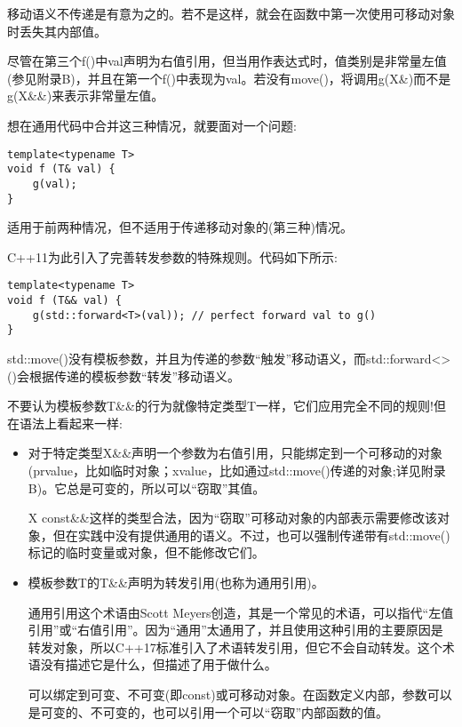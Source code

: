 \begin{tcolorbox}[colback=webgreen!5!white,colframe=webgreen!75!black]
\hspace*{0.75cm}移动语义不传递是有意为之的。若不是这样，就会在函数中第一次使用可移动对象时丢失其内部值。
\end{tcolorbox}

尽管在第三个f()中val声明为右值引用，但当用作表达式时，值类别是非常量左值(参见附录B)，并且在第一个f()中表现为val。若没有move()，将调用g(X\&)而不是g(X\&\&)来表示非常量左值。

想在通用代码中合并这三种情况，就要面对一个问题:

\begin{lstlisting}[style=styleCXX]
template<typename T>
void f (T& val) {
	g(val);
}
\end{lstlisting}

适用于前两种情况，但不适用于传递移动对象的(第三种)情况。

C++11为此引入了完善转发参数的特殊规则。代码如下所示:

\begin{lstlisting}[style=styleCXX]
template<typename T>
void f (T&& val) {
	g(std::forward<T>(val)); // perfect forward val to g()
}
\end{lstlisting}

std::move()没有模板参数，并且为传递的参数“触发”移动语义，而std::forward<>()会根据传递的模板参数“转发”移动语义。

不要认为模板参数T\&\&的行为就像特定类型T一样，它们应用完全不同的规则!但在语法上看起来一样:

\begin{itemize}
\item 
对于特定类型X\&\&声明一个参数为右值引用，只能绑定到一个可移动的对象(prvalue，比如临时对象；xvalue，比如通过std::move()传递的对象;详见附录B)。它总是可变的，所以可以“窃取”其值。

\begin{tcolorbox}[colback=webgreen!5!white,colframe=webgreen!75!black]
\hspace*{0.75cm}X const\&\&这样的类型合法，因为“窃取”可移动对象的内部表示需要修改该对象，但在实践中没有提供通用的语义。不过，也可以强制传递带有std::move()标记的临时变量或对象，但不能修改它们。
\end{tcolorbox}

\item 
模板参数T的T\&\&声明为转发引用(也称为通用引用)。

\begin{tcolorbox}[colback=webgreen!5!white,colframe=webgreen!75!black]
\hspace*{0.75cm}通用引用这个术语由Scott Meyers创造，其是一个常见的术语，可以指代“左值引用”或“右值引用”。因为“通用”太通用了，并且使用这种引用的主要原因是转发对象，所以C++17标准引入了术语转发引用，但它不会自动转发。这个术语没有描述它是什么，但描述了用于做什么。
\end{tcolorbox}

可以绑定到可变、不可变(即const)或可移动对象。在函数定义内部，参数可以是可变的、不可变的，也可以引用一个可以“窃取”内部函数的值。
\end{itemize}

